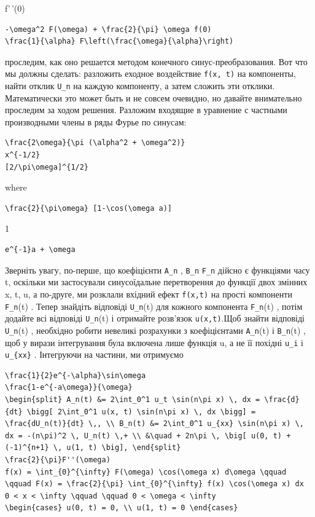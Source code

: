 \documentclass[
  ukrainian,
]{article}
\begin{document}
f'\,'(0)

\begin{verbatim}
-\omega^2 F(\omega) + \frac{2}{\pi} \omega f(0)
\frac{1}{\alpha} F\left(\frac{\omega}{\alpha}\right)
\end{verbatim}

проследим, как оно решается методом конечного синус-преобразования. Вот
что мы должны сделать: разложить еходное воздействие \texttt{f(x,\ t)}
на компоненты, найти отклик \texttt{U\_n} на каждую компоненту, а затем
сложить эти отклики. Математически это может быть и не совсем очевидно,
но давайте внимательно проследим за ходом решения. Разложим входящие в
уравнение с частными производными члены в ряды Фурье по синусам:

\begin{verbatim}
\frac{2\omega}{\pi (\alpha^2 + \omega^2)}
x^{-1/2}
[2/\pi\omega]^{1/2}
\end{verbatim}

where

\begin{verbatim}
\frac{2}{\pi\omega} [1-\cos(\omega a)]
\end{verbatim}

1

\begin{verbatim}
e^{-1}a + \omega
\end{verbatim}

Зверніть увагу, по-перше, що коефіцієнти \texttt{A\_n} , \texttt{B\_n}
\texttt{F\_n} дійсно є функціями часу t, оскільки ми застосували
синусоїдальне перетворення до функції двох змінних x, t, u, а по-друге,
ми розклали вхідний ефект \texttt{f(x,t)} на прості компоненти
\texttt{F\_n}(t) . Тепер знайдіть відповіді \texttt{U\_n}(t) для кожного
компонента \texttt{F\_n}(t) , потім додайте всі відповіді
\texttt{U\_n}(t) і отримайте розв'язок \texttt{u(x,t)}.Щоб знайти
відповіді \texttt{U\_n}(t) , необхідно робити невеликі розрахунки з
коефіцієнтами \texttt{A\_n}(t) і \texttt{B\_n}(t) , щоб у вирази
інтегрування була включена лише функція u, а не її похідні \texttt{u\_i}
і \texttt{u\_\{xx\}} . Інтегруючи на частини, ми отримуємо

\begin{verbatim}
\frac{1}{2}e^{-\alpha}\sin\omega
\frac{1-e^{-a\omega}}{\omega}
\begin{split} A_n(t) &= 2\int_0^1 u_t \sin(n\pi x) \, dx = \frac{d}{dt} \bigg[ 2\int_0^1 u(x, t) \sin(n\pi x) \, dx \bigg] = \frac{dU_n(t)}{dt} \,, \\ B_n(t) &= 2\int_0^1 u_{xx} \sin(n\pi x) \, dx = -(n\pi)^2 \, U_n(t) \,+ \\ &\quad + 2n\pi \, \big[ u(0, t) + (-1)^{n+1} \, u(1, t) \big], \end{split}
\frac{2}{\pi}F''(\omega)
f(x) = \int_{0}^{\infty} F(\omega) \cos(\omega x) d\omega \qquad \qquad F(x) = \frac{2}{\pi} \int_{0}^{\infty} f(x) \cos(\omega x) dx
0 < x < \infty \qquad \qquad 0 < \omega < \infty
\begin{cases} u(0, t) = 0, \\ u(1, t) = 0 \end{cases}
\end{verbatim}
\end{document}
